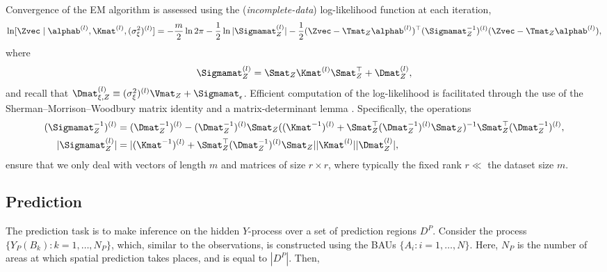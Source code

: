 Convergence of the EM algorithm is assessed using the (\emph{incomplete-data}) log-likelihood function at each iteration,
\begin{equation*}
\ln [\Zvec \mid \alphab^{(l)}, \Kmat^{(l)}, (\sigma^2_\xi)^{(l)}] = -\frac{m}{2}\ln 2\pi -\frac{1}{2}\ln |\Sigmamat_Z^{(l)}| - \frac{1}{2}(\Zvec - \Tmat_Z\alphab^{(l)})^\top(\Sigmamat_Z^{-1})^{(l)}(\Zvec - \Tmat_Z\alphab^{(l)}),
\end{equation*}
where
\begin{equation*}
\Sigmamat_Z^{(l)} = \Smat_Z \Kmat^{(l)} \Smat_Z^\top + \Dmat_Z^{(l)},
\end{equation*}
and recall that $\Dmat_{\xi,Z}^{(l)} \equiv (\sigma_\xi^2)^{(l)}\Vmat_Z + \Sigmamat_\epsilon$. Efficient computation of the log-likelihood is facilitated through the use of the Sherman--Morrison--Woodbury matrix identity and a matrix-determinant lemma \citep[e.g.,][]{Henderson_1981}. Specifically, the operations
\begin{align*}
(\Sigmamat_Z^{-1})^{(l)} &= (\Dmat_Z^{-1})^{(l)} - (\Dmat_Z^{-1})^{(l)} \Smat_Z ((\Kmat^{-1})^{(l)} + \Smat^\top_Z (\Dmat_Z^{-1})^{(l)}\Smat_Z)^{-1}\Smat_Z^\top(\Dmat_Z^{-1})^{(l)},\\
| \Sigmamat_Z^{(l)}  | &= | (\Kmat^{-1})^{(l)} + \Smat_Z^\top(\Dmat_Z^{-1})^{(l)} \Smat_Z | |\Kmat^{(l)} | |\Dmat_Z^{(l)} |,%
\end{align*}
ensure that we only deal with vectors of length $m$ and matrices of size $r \times r$, where typically the fixed rank $r \ll$ the dataset size $m$.


\subsection{Prediction} \label{sec:prediction}

The prediction task is to make inference on the hidden $Y$-process over a set of prediction regions $D^P$. Consider the process $\{Y_P(B_k): k = 1,\dots,N_P\}$, which, similar to the observations, is constructed using the BAUs $\{A_i: i = 1,\dots,N\}$. Here, $N_P$ is the number of areas at which spatial prediction takes places, and is equal to $|D^P|$. Then,

